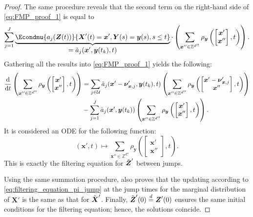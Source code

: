 \begin{proof}
    The same procedure reveals that the second term on the right-hand side of \eqref{eq:FMP_proof_1} is equal to
    \begin{align*}
        \sum_{j = 1}^{J} \underbrace{\Econdmu{a_j (\boldsymbol{Z}(t))}{ \boldsymbol{X}'(t) = \boldsymbol{x}', \boldsymbol{Y}(s) = \boldsymbol{y}(s), s \leq t}}_{\textstyle = \Tilde{a}_j (\boldsymbol{x}', \boldsymbol{y}(t_k), t) } \cdot \left( \sum_{\boldsymbol{x}'' \in \mathbb{Z}^{d''}} \rho_{\boldsymbol{y}} \left( \begin{bmatrix} \boldsymbol{x}' \\ \boldsymbol{x}'' \end{bmatrix}, t \right) \right).
    \end{align*}
    Gathering all the results into \eqref{eq:FMP_proof_1} yields the following:
    \begin{align*}
        \frac{\mathrm{d}}{\mathrm{d} t} \left( \sum_{\boldsymbol{x}'' \in \mathbb{Z}^{d''}} \rho_{\boldsymbol{y}} \left( \begin{bmatrix} \boldsymbol{x}' \\ \boldsymbol{x}'' \end{bmatrix}, t \right) \right) 
        &= \sum_{j \in \mathcal{U}} \Tilde{a}_j (\boldsymbol{x}' - \boldsymbol{\nu}_{\boldsymbol{x}, j}', \boldsymbol{y}(t_k), t) \left( \sum_{\boldsymbol{x}'' \in \mathbb{Z}^{d''}} \rho_{\boldsymbol{y}} \left( \begin{bmatrix} \boldsymbol{x}'  - \boldsymbol{\nu}_{\boldsymbol{x}, j}' \\ \boldsymbol{x}'' \end{bmatrix}, t \right) \right) \\
        &- \sum_{j=1}^{J} \Tilde{a}_j (\boldsymbol{x}',  \boldsymbol{y}(t_k)) \left( \sum_{\boldsymbol{x}'' \in \mathbb{Z}^{d''}} \rho_{\boldsymbol{y}} \left( \begin{bmatrix} \boldsymbol{x}' \\ \boldsymbol{x}'' \end{bmatrix}, t \right) \right) .
    \end{align*}
    It is considered an \ac{ODE} for the following function:
    $$ 
        (\boldsymbol{x}', t) \mapsto \sum\limits_{\boldsymbol{x}'' \in \mathbb{Z}^{d''}} \rho_{\boldsymbol{y}} \left( \begin{bmatrix} \boldsymbol{x}' \\ \boldsymbol{x}'' \end{bmatrix}, t \right) .
    $$  
    This is exactly the filtering equation for $\Tilde{\boldsymbol{Z}}'$ between jumps. 
    
    Using the same summation procedure, also proves that the updating according to \eqref{eq:filtering_equation_pi_jump} at the jump times for the marginal distribution of $\boldsymbol{X}'$ is the same as that for $\Tilde{\boldsymbol{X}}'$. Finally, $\Tilde{\boldsymbol{Z}}'(0) \overset{d}{=} \boldsymbol{Z}'(0)$ ensures the same initial conditions for the filtering equation; hence, the solutions coincide.
\end{proof}







